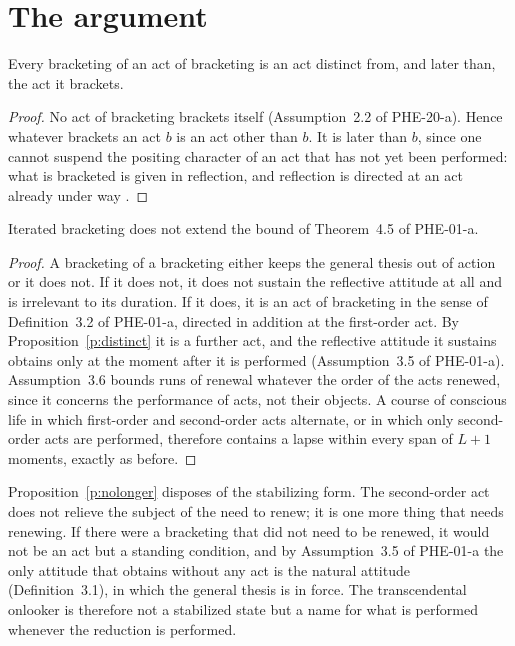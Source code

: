 \documentclass{situationist-preprint}
\begin{document}
\section{The argument}

\begin{proposition}\label{p:distinct}
Every bracketing of an act of bracketing is an act distinct from, and later than, the act it brackets.
\end{proposition}

\begin{proof}
No act of bracketing brackets itself (Assumption~2.2 of PHE-20-a). Hence whatever brackets an act $b$ is an act other than $b$. It is later than $b$, since one cannot suspend the positing character of an act that has not yet been performed: what is bracketed is given in reflection, and reflection is directed at an act already under way \citep[\S77]{Husserl1913}.
\end{proof}

\begin{proposition}\label{p:nolonger}
Iterated bracketing does not extend the bound of Theorem~4.5 of PHE-01-a.
\end{proposition}

\begin{proof}
A bracketing of a bracketing either keeps the general thesis out of action or it does not. If it does not, it does not sustain the reflective attitude at all and is irrelevant to its duration. If it does, it is an act of bracketing in the sense of Definition~3.2 of PHE-01-a, directed in addition at the first-order act. By Proposition~\ref{p:distinct} it is a further act, and the reflective attitude it sustains obtains only at the moment after it is performed (Assumption~3.5 of PHE-01-a). Assumption~3.6 bounds runs of renewal whatever the order of the acts renewed, since it concerns the performance of acts, not their objects. A course of conscious life in which first-order and second-order acts alternate, or in which only second-order acts are performed, therefore contains a lapse within every span of $L+1$ moments, exactly as before.
\end{proof}

Proposition~\ref{p:nolonger} disposes of the stabilizing form. The second-order act does not relieve the subject of the need to renew; it is one more thing that needs renewing. If there were a bracketing that did not need to be renewed, it would not be an act but a standing condition, and by Assumption~3.5 of PHE-01-a the only attitude that obtains without any act is the natural attitude (Definition~3.1), in which the general thesis is in force. The transcendental onlooker is therefore not a stabilized state but a name for what is performed whenever the reduction is performed.
\end{document}
